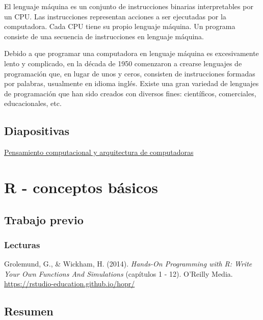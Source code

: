 \documentclass[
  letterpaper,
  DIV=11,
  numbers=noendperiod]{scrreprt}
\begin{document}
El lenguaje máquina es un conjunto de instrucciones binarias
interpretables por un CPU. Las instrucciones representan acciones a ser
ejecutadas por la computadora. Cada CPU tiene su propio lenguaje
máquina. Un programa consiste de una secuencia de instrucciones en
lenguaje máquina.

Debido a que programar una computadora en lenguaje máquina es
excesivamente lento y complicado, en la década de 1950 comenzaron a
crearse lenguajes de programación que, en lugar de unos y ceros,
consisten de instrucciones formadas por palabras, usualmente en idioma
inglés. Existe una gran variedad de lenguajes de programación que han
sido creados con diversos fines: científicos, comerciales,
educacionales, etc.

\hypertarget{diapositivas}{%
\section{Diapositivas}\label{diapositivas}}

\href{https://pf0953-programacionr.github.io/2022-ii-pensamiento_computacional-arquitectura_computadoras/}{Pensamiento
computacional y arquitectura de computadoras}

\hypertarget{r---conceptos-buxe1sicos}{%
\chapter{R - conceptos básicos}\label{r---conceptos-buxe1sicos}}

\hypertarget{trabajo-previo-4}{%
\section{Trabajo previo}\label{trabajo-previo-4}}

\hypertarget{lecturas-2}{%
\subsection{Lecturas}\label{lecturas-2}}

Grolemund, G., \& Wickham, H. (2014). \emph{Hands-On Programming with R:
Write Your Own Functions And Simulations} (capítulos 1 - 12). O'Reilly
Media. \url{https://rstudio-education.github.io/hopr/}

\hypertarget{resumen-3}{%
\section{Resumen}\label{resumen-3}}
\end{document}
